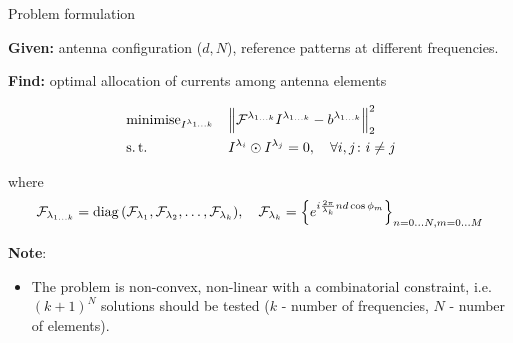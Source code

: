 \documentclass[../main.tex]{subfiles}
\begin{document}
%
%

\begin{frame}[t]{Problem formulation}

\textbf{Given:} antenna configuration ($d, N$), reference patterns at different frequencies.

\textbf{Find:} optimal allocation of currents among antenna elements
    
\begin{equation*}
\begin{aligned}
& \operatorname{minimise}_{I^{\lambda_{1\ldots k}}} 
& & \Big\| \mathcal{F}^{\lambda_{1 \ldots k}} I^{\lambda_{1\ldots k}} - b^{\lambda_{1 \ldots k}} \Big\|_2^2 \\
& \operatorname{s.t.}
& & I^{\lambda_i} \odot I^{\lambda_j} = 0, \quad \forall i, j \colon i \ne j \\
\end{aligned}
\end{equation*}

where 
\begin{equation*}
  \mathcal{F}_{\lambda_{1 \ldots k}} = \operatorname{diag}{(\mathcal{F}_{\lambda_1}, \mathcal{F}_{\lambda_2}, \ldots, \mathcal{F}_{\lambda_k})}, \quad \mathcal{F}_{\lambda_{k}} = \Big\{ e^{i \frac{2\pi}{\lambda_k}n d \cos{\phi_m}} \Big\}_{n=0\ldots N, m = 0\ldots M}
\end{equation*}

\textbf{Note}: 
\begin{itemize}
    \item The problem is non-convex, non-linear with a combinatorial constraint, i.e. $(k+1)^N$ solutions should be tested ($k$ - number of frequencies, $N$ - number of elements).
\end{itemize}

\end{frame}


%
%
\end{document}
